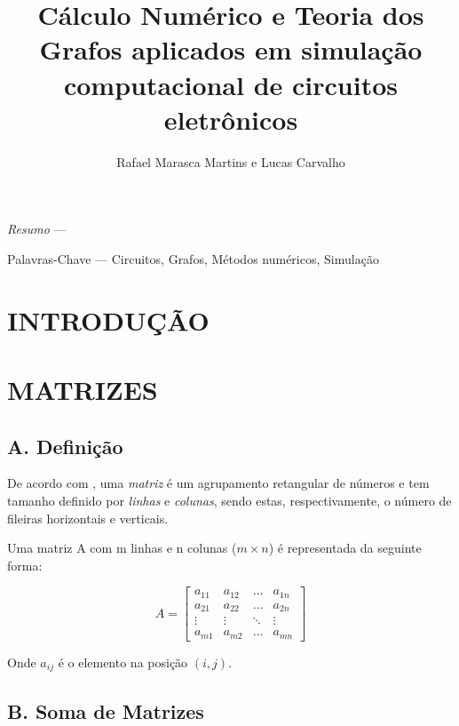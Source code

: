 \documentclass[twocolumn, 10pt]{extarticle}
\begin{document}
\singlespacing

\title{Cálculo Numérico e Teoria dos Grafos aplicados em simulação computacional de circuitos eletrônicos}
\date{}
\author{Rafael Marasca Martins e Lucas Carvalho}

\maketitle

\thispagestyle{empty}

\begin{bfseries}
\small
\textit{Resumo} —

\bigskip
Palavras-Chave — Circuitos, Grafos, Métodos numéricos, Simulação
\end{bfseries}

\section{INTRODUÇÃO}


\section{MATRIZES}
\subsection*{A. \quad Definição}

De acordo com \cite[p. 26]{antonAlgebra}, uma \textit{matriz} é um agrupamento retangular de números e tem tamanho definido por \textit{linhas} e \textit{colunas}, sendo estas, respectivamente, o número de fileiras horizontais e verticais.

Uma matriz A com m linhas e n colunas ($m \times n$) é representada da seguinte forma:

\[ 
A = 
\begin{bmatrix}
a_{11} & a_{12} & \dots & a_{1n} \\
a_{21} & a_{22} & \dots & a_{2n} \\
\vdots & \vdots & \ddots & \vdots \\
a_{m1} & a_{m2} & \dots & a_{mn} 

\end{bmatrix}
\]

Onde $a_{ij}$ é o elemento na posição $(i, j)$.


\subsection*{B. \quad Soma de Matrizes}
\end{document}
